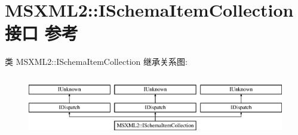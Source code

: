 \hypertarget{interface_m_s_x_m_l2_1_1_i_schema_item_collection}{}\section{M\+S\+X\+M\+L2\+:\+:I\+Schema\+Item\+Collection接口 参考}
\label{interface_m_s_x_m_l2_1_1_i_schema_item_collection}
类 M\+S\+X\+M\+L2\+:\+:I\+Schema\+Item\+Collection 继承关系图\+:\begin{figure}[H]
\begin{center}
\leavevmode
\includegraphics[height=2.731707cm]{interface_m_s_x_m_l2_1_1_i_schema_item_collection}
\end{center}
\end{figure}
